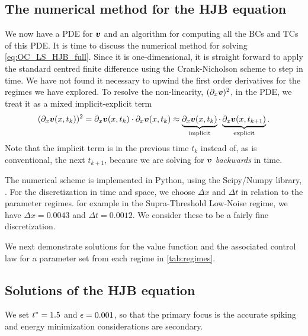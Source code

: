 \documentclass[12pt]{iopart}
\begin{document}
\subsection{The numerical method for the HJB equation}

We now have a PDE for ${ \boldsymbol{v} }$ and an algorithm for computing all the BCs and TCs of
this PDE. It is time to discuss the numerical method for solving
\cref{eq:OC_LS_HJB_full}. Since it is one-dimensional, it is straight forward to
apply the standard centred finite difference using the Crank-Nicholson scheme to
step in time. We have not found it necessary to upwind the first order
derivatives for the regimes we have explored. To resolve the non-linearity,
$({\partial}_x{ \boldsymbol{v} })^2$, in the PDE, we treat it as a mixed implicit-explicit term
$$({\partial}_x { \boldsymbol{v} }(x,t_k))^2 = {\partial}_x { \boldsymbol{v} }(x,t_k) \cdot {\partial}_x { \boldsymbol{v} }(x,t_k) \approx
\underbrace{{\partial}_x { \boldsymbol{v} }(x,t_k)}_{\textrm{implicit}} \cdot
\underbrace{{\partial}_x{ \boldsymbol{v} }(x,t_{k+1})}_{\textrm{explicit}}.$$ Note that the implicit
term is in the previous time $t_k$ instead of, as is conventional, the next
$t_{k+1}$, because we are solving for ${ \boldsymbol{v} }$ {\sl backwards} in time.

The numerical scheme is implemented in Python, using the Scipy/Numpy library,
\cite{Scipy}. For the discretization in time and space, we choose $\Delta x$ and
$\Delta t$ in relation to the parameter regimes. for example in the
Supra-Threshold Low-Noise regime, we have $\Delta x = 0.0043$ and $\Delta t =
0.0012$. We consider these to be a fairly fine discretization. 

We next demonstrate solutions for the value function and the associated
control law for a parameter set from each regime in \cref{tab:regimes}.

\subsection{Solutions of the HJB equation}
We set ${ t^* }=1.5$ and ${\epsilon} = 0.001$, so that the primary focus is the accurate
spiking and energy minimization considerations are secondary.
\end{document}
